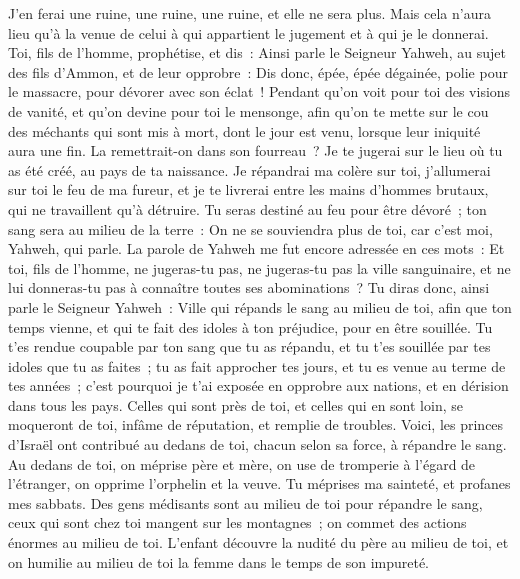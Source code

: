 \begin{multicols}{2}
J'en ferai une ruine, une ruine, une ruine, et elle ne sera plus. Mais cela n'aura lieu qu'à la venue de celui à qui appartient le jugement et à qui je le donnerai.
Toi, fils de l'homme, prophétise, et dis~: Ainsi parle le Seigneur Yahweh, au sujet des fils d'Ammon, et de leur opprobre~: Dis donc, épée, épée dégainée, polie pour le massacre, pour dévorer avec son éclat~!
Pendant qu'on voit pour toi des visions de vanité, et qu'on devine pour toi le mensonge, afin qu'on te mette sur le cou des méchants qui sont mis à mort, dont le jour est venu, lorsque leur iniquité aura une fin.
La remettrait-on dans son fourreau~? Je te jugerai sur le lieu où tu as été créé, au pays de ta naissance.
Je répandrai ma colère sur toi, j'allumerai sur toi le feu de ma fureur, et je te livrerai entre les mains d'hommes brutaux, qui ne travaillent qu'à détruire.
Tu seras destiné au feu pour être dévoré~; ton sang sera au milieu de la terre~: On ne se souviendra plus de toi, car c'est moi, Yahweh, qui parle.
\VerseOne{}La parole de Yahweh me fut encore adressée en ces mots~:
Et toi, fils de l'homme, ne jugeras-tu pas, ne jugeras-tu pas la ville sanguinaire, et ne lui donneras-tu pas à connaître toutes ses abominations~?
Tu diras donc, ainsi parle le Seigneur Yahweh~: Ville qui répands le sang au milieu de toi, afin que ton temps vienne, et qui te fait des idoles à ton préjudice, pour en être souillée.
Tu t'es rendue coupable par ton sang que tu as répandu, et tu t'es souillée par tes idoles que tu as faites~; tu as fait approcher tes jours, et tu es venue au terme de tes années~; c'est pourquoi je t'ai exposée en opprobre aux nations, et en dérision dans tous les pays.
Celles qui sont près de toi, et celles qui en sont loin, se moqueront de toi, infâme de réputation, et remplie de troubles.
Voici, les princes d'Israël ont contribué au dedans de toi, chacun selon sa force, à répandre le sang.
Au dedans de toi, on méprise père et mère, on use de tromperie à l'égard de l'étranger, on opprime l'orphelin et la veuve.
Tu méprises ma sainteté, et profanes mes sabbats.
Des gens médisants sont au milieu de toi pour répandre le sang, ceux qui sont chez toi mangent sur les montagnes~; on commet des actions énormes au milieu de toi.
L'enfant découvre la nudité du père au milieu de toi, et on humilie au milieu de toi la femme dans le temps de son impureté.

\end{multicols}
